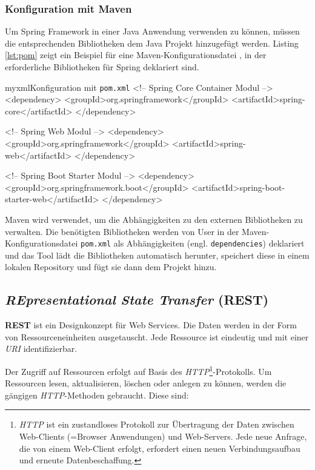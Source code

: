 \subsubsection{Konfiguration mit Maven}

Um Spring Framework in einer Java Anwendung verwenden zu können, müssen die entsprechenden Bibliotheken dem Java Projekt hinzugefügt werden. Listing \ref{lst:pom} zeigt ein Beispiel für eine Maven-Konfigurationsdatei \cite{maven}, in der erforderliche Bibliotheken für Spring deklariert sind.

\begin{listingsboxJava}[label={lst:pom}]{myxml}{Konfiguration mit \texttt{pom.xml}}
	<!-- Spring Core Container Modul -->
	<dependency>
		<groupId>org.springframework</groupId>
		<artifactId>spring-core</artifactId>
	</dependency>

	<!-- Spring Web Modul -->
	<dependency>
		<groupId>org.springframework</groupId>
		<artifactId>spring-web</artifactId>
	</dependency>
	
	<!-- Spring Boot Starter Modul -->
	<dependency>
		<groupId>org.springframework.boot</groupId>
		<artifactId>spring-boot-starter-web</artifactId>
	</dependency>
\end{listingsboxJava}
Maven wird verwendet, um die Abhängigkeiten zu den externen Bibliotheken zu verwalten. Die benötigten Bibliotheken werden von User in der Maven-Konfigurationsdatei \texttt{pom.xml} als Abhängigkeiten (engl. \texttt{dependencies}) deklariert und das Tool lädt die Bibliotheken automatisch herunter, speichert diese in einem lokalen Repository und fügt sie dann dem Projekt hinzu.

\subsection{\textit{\textbf{RE}presentational \textbf{S}tate \textbf{T}ransfer} (REST)}

\textbf{REST} ist ein Designkonzept für Web Services. Die Daten werden in der Form von Ressourceneinheiten ausgetauscht. Jede Ressource ist eindeutig und mit einer \textit{URI} identifizierbar.

Der Zugriff auf Ressourcen erfolgt auf Basis des \textit{HTTP}\footnote{\textit{HTTP} ist ein zustandloses Protokoll zur Übertragung der Daten zwischen Web-Clients (=Browser Anwendungen) und Web-Servers. Jede neue Anfrage, die von einem Web-Client erfolgt, erfordert einen neuen Verbindungsaufbau und erneute Datenbeschaffung.}-Protokolls. Um Ressourcen lesen, aktualisieren, löschen oder anlegen zu können, werden die gängigen \textit{HTTP}-Methoden gebraucht. Diese sind:


